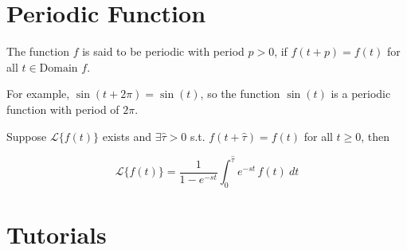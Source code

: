 \section{Periodic Function}

\begin{definition}
    The function $f$ is said to be periodic with period $p > 0$, if $f(t + p) = f(t)$ 
    for all $t \in \text{Domain } f$.
\end{definition}

For example, $\sin(t + 2\pi) = \sin(t)$, so the function $\sin(t)$ is a periodic function 
with period of $2\pi$.

\begin{theorem}
    Suppose $\mathcal{L}\{f(t)\}$ exists and $\exists \hat{\tau} > 0$ s.t. $f(t + \hat{\tau}) = f(t)$ for all 
    $t \geq 0$, then 

    \begin{equation}
        \mathcal{L}\{f(t)\} = \frac{1}{1 - e^{-st}} \int_{0}^{\hat{\tau}} e^{-st}\, f(t)\> dt
    \end{equation}
\end{theorem}

\section{Tutorials}

